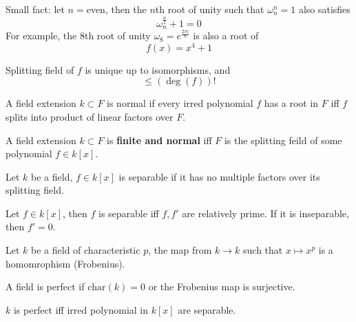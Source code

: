 \documentclass[openany]{book}
\newcommand{\om}{\omega}
\begin{document}
\begin{prop}
    Small fact: let $n=$even, then the $n$th root of unity such that $\om_n^n=1$ also satisfies 
    \begin{equation*}
        \om_n^\frac{n}{2}+1=0
    \end{equation*}
    For example, the $8$th root of unity $\om_8=e^{\frac{2\pi i}{8}}$ is also a root of 
    \begin{equation*}
        f(x)=x^4+1
    \end{equation*}
\end{prop}

\begin{prop}
    Splitting field of $f$ is unique up to isomorphisms, and 
    \begin{equation*}
        [F:k]\leq(\deg(f))!
    \end{equation*}
\end{prop}



\begin{defn}
    A field extension $k\subset F$ is normal if every irred polynomial $f$ has a root in $F$ iff $f$ splits into product of linear factors over $F$.
\end{defn}

\begin{prop}[normal]
    A field extension $k\subset F$ is \textbf{finite and normal} iff $F$ is the splitting feild of some polynomial $f\in k[x]$.
\end{prop}



\begin{defn}
    Let $k$ be a field, $f\in k[x]$ is separable if it has no multiple factors over its splitting field.
\end{defn}

\begin{prop}
    Let $f\in k[x]$, then $f$ is separable iff $f, f'$ are relatively prime. If it is inseparable, then $f'=0$.
\end{prop}



\begin{defn}
    Let $k$ be a field of characteristic $p$, the map from $k\to k$ such that $x\mapsto x^p$ is a homomrophism (Frobenius).

    A field is perfect if $\text{char}(k)=0$ or the Frobenius map is surjective.
\end{defn}

\begin{prop}
    $k$ is perfect iff irred polynomial in $k[x]$ are separable.
\end{prop}
\end{document}
